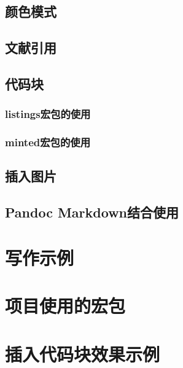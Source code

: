 \documentclass[12pt, blue]{uglynote}
\begin{document}
\subsection{颜色模式}\label{ssec:colors}


\subsection{文献引用}


\subsection{代码块}


\subsubsection{listings宏包的使用}

\subsubsection{minted宏包的使用}


\subsection{插入图片}


\subsection{Pandoc Markdown结合使用}



\section{写作示例}




\printbibliography[
  title=\ebibname
]

\clearpage
\appendix
\addappheadtotoc
\appendixpage

\section{项目使用的宏包}


\section{插入代码块效果示例}

\end{document}
